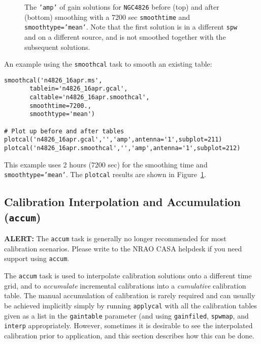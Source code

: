 \begin{figure}[h!]
\begin{center}
\caption{\label{fig:smoothcal_4826} The {\tt 'amp'} of gain solutions
for {\tt NGC4826} before (top) and after (bottom) smoothing with
a 7200 sec {\tt smoothtime} and {\tt smoothtype='mean'}.  Note that
the first solution is in a different {\tt spw} and on a different
source, and is not smoothed together with the subsequent solutions.}
\hrulefill
\end{center}
\end{figure}

An example using the {\tt smoothcal} task to smooth an existing table:
\small
\begin{verbatim}
smoothcal('n4826_16apr.ms',
       tablein='n4826_16apr.gcal',
       caltable='n4826_16apr.smoothcal',
       smoothtime=7200.,
       smoothtype='mean')

# Plot up before and after tables
plotcal('n4826_16apr.gcal','','amp',antenna='1',subplot=211)
plotcal('n4826_16apr.smoothcal','','amp',antenna='1',subplot=212)
\end{verbatim}
\normalsize
This example uses 2 hours (7200 sec) for the smoothing time and
{\tt smoothtype='mean'}.  The {\tt plotcal} results are shown
in Figure~\ref{fig:smoothcal_4826}.


\subsection{Calibration Interpolation and Accumulation ({\tt accum})}
\label{section:cal.tables.accum}

{\bf ALERT:} The {\tt accum} task is generally no longer recommended
for most calibration scenarios.  Please write to the NRAO CASA
helpdesk  if you need support using {\tt accum}.

The {\tt accum} task is used to interpolate calibration solutions onto
a different time grid, and to {\it accumulate} incremental
calibrations into a {\it cumulative} calibration table.  The manual
accumulation of calibration is rarely required and can usually be
achieved implicitly simply by running {\tt applycal} with all the
calibration tables given as a list in the {\tt gaintable} parameter
(and using {\tt gainfiled}, {\tt spwmap}, and {\tt interp}
appropriately.  However, sometimes it is desirable to see the
interpolated calibration prior to application, and this section
describes how this can be done.

